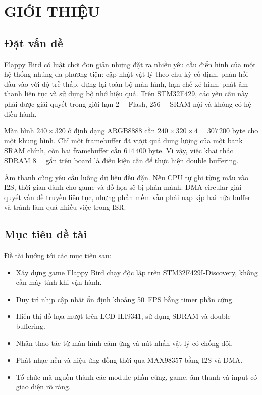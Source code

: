 \chapter{GIỚI THIỆU}

\section{Đặt vấn đề}

Flappy Bird có luật chơi đơn giản nhưng đặt ra nhiều yêu cầu điển hình của một hệ thống nhúng đa phương tiện: cập nhật vật lý theo chu kỳ cố định, phản hồi đầu vào với độ trễ thấp, dựng lại toàn bộ màn hình, hạn chế xé hình, phát âm thanh liên tục và sử dụng bộ nhớ hiệu quả. Trên STM32F429, các yêu cầu này phải được giải quyết trong giới hạn \SI{2}{\mega\byte} Flash, \SI{256}{\kilo\byte} SRAM nội và không có hệ điều hành.

Màn hình $240\times320$ ở định dạng ARGB8888 cần $240\times320\times4=307\,200$ byte cho một khung hình. Chỉ một framebuffer đã vượt quá dung lượng của một bank SRAM chính, còn hai framebuffer cần $614\,400$ byte. Vì vậy, việc khai thác SDRAM \SI{8}{\mega\byte} gắn trên board là điều kiện cần để thực hiện double buffering.

Âm thanh cũng yêu cầu luồng dữ liệu đều đặn. Nếu CPU tự ghi từng mẫu vào I2S, thời gian dành cho game và đồ họa sẽ bị phân mảnh. DMA circular giải quyết vấn đề truyền liên tục, nhưng phần mềm vẫn phải nạp kịp hai nửa buffer và tránh làm quá nhiều việc trong ISR.

\section{Mục tiêu đề tài}

Đề tài hướng tới các mục tiêu sau:

\begin{itemize}
  \item Xây dựng game Flappy Bird chạy độc lập trên STM32F429I-Discovery, không cần máy tính khi vận hành.
  \item Duy trì nhịp cập nhật ổn định khoảng \SI{50}{FPS} bằng timer phần cứng.
  \item Hiển thị đồ họa mượt trên LCD ILI9341, sử dụng SDRAM và double buffering.
  \item Nhận thao tác từ màn hình cảm ứng và nút nhấn vật lý có chống dội.
  \item Phát nhạc nền và hiệu ứng đồng thời qua MAX98357 bằng I2S và DMA.
  \item Tổ chức mã nguồn thành các module phần cứng, game, âm thanh và input có giao diện rõ ràng.
\end{itemize}

